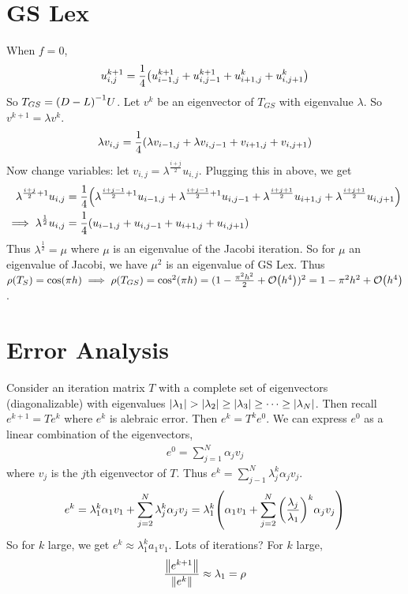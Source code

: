 \documentclass{article}
\begin{document}
    \section{GS Lex}
        When $f = 0$,
        \begin{align*}
            u_{i,j}^{k+1} = \frac{1}{4}\qty(u_{i-1,j}^{k+1} + u_{i,j-1}^{k+1} + u_{i+1,j}^k + u_{i,j+1}^k)
        \end{align*}
        So $T_{GS} = \qty(D - L)^{-1}U$.  Let $v^k$ be an eigenvector of $T_{GS}$ with eigenvalue $\lambda$.  So $v^{k+1} = \lambda v^k$.
        \begin{align*}
            \lambda v_{i,j} = \frac{1}{4}\qty(\lambda v_{i-1,j} + \lambda v_{i,j-1} + v_{i+1,j} + v_{i,j+1})
        \end{align*}
        Now change variables: let $v_{i,j} = \lambda^{\frac{i+j}{2}}u_{i,j}$.  Plugging this in above, we get
        \begin{align*}
            \lambda^{\frac{i+j}{2}+1}u_{i,j} &= \frac{1}{4}\qty(\lambda^{\frac{i+j-1}{2}+1}u_{i-1,j} + \lambda^{\frac{i+j-1}{2}+1}u_{i,j-1} + \lambda^{\frac{i+j+1}{2}}u_{i+1,j} + \lambda^{\frac{i+j+1}{2}}u_{i,j+1}) \\
            \implies \lambda^\frac{1}{2}u_{i,j} &= \frac{1}{4}\qty(u_{i-1,j} + u_{i,j-1} + u_{i+1,j} + u_{i,j+1})
        \end{align*}
        Thus $\lambda^\frac{1}{2} = \mu$ where $\mu$ is an eigenvalue of the Jacobi iteration.  So for $\mu$ an eigenvalue of Jacobi, we have $\mu^2$ is an eigenvalue of GS Lex. Thus $\rho(T_S) = \cos(\pi h) \implies \rho(T_{GS}) = \cos^2(\pi h) = (1 - \frac{\pi^2 h^2}{2} + \order{h^4})^2 = 1 - \pi^2h^2 + \order{h^4}$.

    \section{Error Analysis}
        Consider an iteration matrix $T$ with a complete set of eigenvectors (diagonalizable) with eigenvalues $\abs{\lambda_1} > \abs{\lambda_2} \geq \abs{\lambda_3} \geq \dots \geq \abs{\lambda_N}$.  Then recall $e^{k+1} = T e^k$ where $e^k$ is alebraic error.  Then $e^k = T^k e^0$.  We can express $e^0$ as a linear combination of the eigenvectors,
        \begin{align*}
            e^0 = \sum_{j=1}^N \alpha_j v_j
        \end{align*}
        where $v_j$ is the $j$th eigenvector of $T$.  Thus $e^k = \sum_{j-1}^N \lambda_j^k\alpha_j v_j$.
        \begin{align*}
            e^k = \lambda_1^k\alpha_1v_1 + \sum_{j=2}^N\lambda_j^k\alpha_jv_j = \lambda_1^k\qty(\alpha_1v_1 + \sum_{j=2}^N\qty(\frac{\lambda_j}{\lambda_1})^k\alpha_jv_j)
        \end{align*}
        So for $k$ large, we get $e^k \approx \lambda_1^k a_1 v_1$.  Lots of iterations?  For $k$ large,
        \begin{align*}
            \frac{\norm{e^{k+1}}}{\norm{e^k}} \approx \lambda_1 = \rho
        \end{align*}
\end{document}
